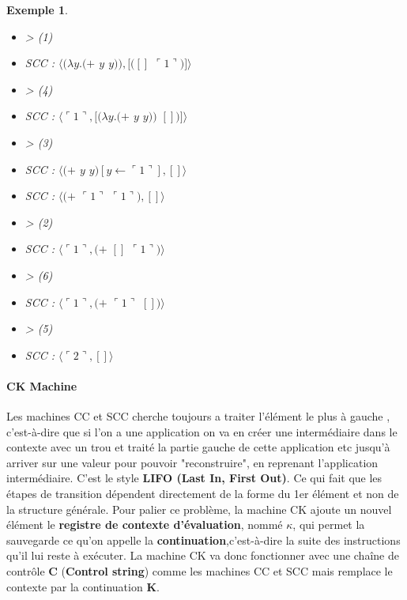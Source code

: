 \documentclass[10pt,a4paper]{report}
\newtheorem{ex}{Exemple}
\begin{document}
\begin{ex}
\begin{multicols}{2}
{			\begin{itemize}
				\item[] > (1) 
				\item[] SCC : $\langle(\lambda y.(+$ $y$ $y)),[([]$ $\ulcorner 1\urcorner)]\rangle$
				\item[] > (4)
				\item[] SCC : $\langle\ulcorner 1\urcorner,[(\lambda y.(+$ $y$ $y))$ $[])]\rangle$
				\item[] > (3) 
				\item[] SCC : $\langle(+$ $y$ $y)[y \leftarrow \ulcorner 1\urcorner],[]\rangle$	
				\item[] SCC : $\langle(+$ $\ulcorner 1\urcorner$ $\ulcorner 1\urcorner),[]\rangle$	
				\item[] > (2) 
				\item[] SCC : $\langle\ulcorner 1\urcorner,(+$ $[]$ $\ulcorner 1\urcorner)\rangle$	
				\item[] > (6) 
				\item[] SCC : $\langle\ulcorner 1\urcorner,(+$ $\ulcorner 1\urcorner$ $[])\rangle$	
				\item[] > (5)
				\item[] SCC : $\langle\ulcorner 2\urcorner,[]\rangle$	
			\end{itemize}
		}
	\end{multicols}
\end{ex}



\paragraph{CK Machine}

Les machines CC et SCC cherche toujours a traiter l'élément le plus à gauche , c'est-à-dire que si l'on a une application on va en créer une intermédiaire dans le contexte avec un trou et traité la partie gauche de cette application etc jusqu'à arriver sur une valeur pour pouvoir "reconstruire", en reprenant l'application intermédiaire. C'est le style \textbf{ LIFO (Last In, First Out)}. Ce qui fait que les étapes de transition dépendent directement de la forme du 1er élément et non de la structure générale.
\smallbreak
Pour palier ce problème, la machine CK ajoute un nouvel élément le \textbf{registre de contexte d'évaluation}, nommé $\kappa$, qui permet la sauvegarde ce qu'on appelle la \textbf{continuation},c'est-à-dire la suite des instructions qu'il lui reste à exécuter.
\smallbreak
La machine CK va donc fonctionner avec une chaîne de contrôle \textbf{C} (\textbf{Control string}) comme les machines CC et SCC mais remplace le contexte par la continuation \textbf{K}. 
\medbreak
\end{document}
